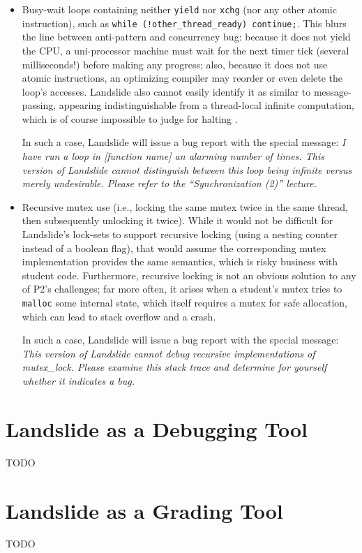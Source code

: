 \begin{itemize}
	\item Busy-wait loops containing neither {\tt yield} nor {\tt xchg} (nor any other atomic instruction), such as {\tt while (!other\_thread\_ready) continue;}.
		This blurs the line between anti-pattern and concurrency bug:
		because it does not yield the CPU, a uni-processor machine must wait for the next timer tick (several milliseconds!) before making any progress;
		also, because it does not use atomic instructions, an optimizing compiler may reorder or even delete the loop's accesses.
		Landslide also cannot easily identify it as similar to message-passing,
		appearing indistinguishable
		from a thread-local infinite computation,
		which is of course impossible to judge for halting \cite{entscheidungsproblem}.

		In such a case, Landslide will issue a bug report with the special message:
		{\em I have run a loop in [function name] an alarming number of times.
		This version of Landslide cannot distinguish between this loop being infinite versus merely undesirable.
		Please refer to the ``Synchronization (2)'' lecture.}
	\item Recursive mutex use (i.e., locking the same mutex twice in the same thread, then subsequently unlocking it twice).
		While it would not be difficult for Landslide's lock-sets to support recursive locking (using a nesting counter instead of a boolean flag),
		that would assume the corresponding mutex implementation provides the same semantics,
		which is risky business with student code. %
		Furthermore, recursive locking is not an obvious solution to any of P2's challenges;
		far more often, it arises when a student's mutex tries to {\tt malloc} some internal state,
		which itself requires a mutex for safe allocation, which can lead to stack overflow and a crash.

		In such a case, Landslide will issue a bug report with the special message:
		{\em This version of Landslide cannot debug recursive implementations of mutex\_lock.
		Please examine this stack trace and determine for yourself whether it indicates a bug.}
\end{itemize}

\section{Landslide as a Debugging Tool}
\label{sec:studence}

TODO

\section{Landslide as a Grading Tool}
\label{sec:grading}

TODO
